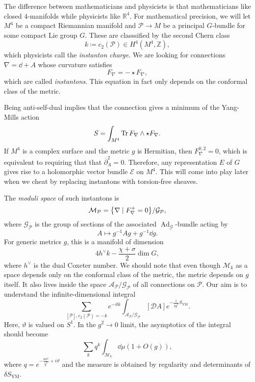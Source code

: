 \documentclass[leqno, openany]{memoir}
\theoremstyle{definition}
\theoremstyle{remark}
\theoremstyle{plain}
\theoremstyle{definition}
\theoremstyle{remark}
\newcommand{\R}{\mathbb{R}}
\newcommand{\Z}{\mathbb{Z}}
\newcommand{\mc}[1]{\mathcal{#1}}
\newcommand{\mr}[1]{\mathrm{#1}}
\newcommand{\ol}[1]{\overline{#1}}
\DeclareMathOperator{\Ad}{Ad}
\begin{document}
The difference between mathematicians and physicists is that mathematicians like closed $4$-manifolds while physicists like $\R^4$. For mathematical precision, we will let $M^4$ be a compact Riemannian manifold and $\mc{P} \to M$ be a principal $G$-bundle for some compact Lie group $G$. These are classsified by the second Chern class
\[ k \coloneqq c_2(\mc{P}) \in H^4(M^4, \Z), \]
which physicists call the \textit{instanton charge}. We are looking for connections $\nabla = \dd + A$ whose curvature satisfies
\[ F_{\nabla} = - \star F_{\nabla}, \]
which are called \textit{instantons}. This equation in fact only depends on the conformal class of the metric.

Being anti-self-dual implies that the connection gives a minimum of the Yang-Mills action
\[ S = \int_{M^4} \Tr F_{\nabla} \wedge \star F_{\nabla}. \]
If $M^4$ is a complex surface and the metric $g$ is Hermitian, then $F_{\nabla}^{0,2} = 0$, which is equivalent to requiring that that $\ol{\partial}_A^2 = 0$. Therefore, any representation $E$ of $G$ gives rise to a holomorphic vector bundle $\mc{E}$ on $M^4$. This will come into play later when we cheat by replacing instantons with torsion-free sheaves.

The \textit{moduli space} of such instantons is
\[ \mc{M}_{\mc{P}} = \qty{\nabla \mid F_{\nabla}^+ = 0} / \mc{G}_{\mc{P}}, \]
where $\mc{G}_{\mc{P}}$ is the group of sections of the associated $\Ad_{\mc{G}}$-bundle acting by
\[ A \mapsto g^{-1} A g + g^{-1} \dd g. \]
For generic metrics $g$, this is a manifold of dimension
\[ 4 h^{\vee} k - \frac{\chi + \sigma}{2} \dim G, \]
where $h^{\vee}$ is the dual Coxeter number. We should note that even though $\mc{M}_k$ as a space depends only on the conformal class of the metric, the metric depends on $g$ itself. It also lives inside the space $\mc{A}_{\mc{P}}/\mc{G}_{\mc{P}}$ of all connections on $\mc{P}$. Our aim is to understand the infinite-dimensional integral
\[ \sum_{[\mc{P}], c_2(\mc{P}) = -k} e^{- \vartheta k} \int_{\mc{A}_{\mc{P}}/\mc{G}_{\mc{P}}} [\mc{D}A] e^{-\frac{1}{4g^2} S_{\mr{YM}}}. \]
Here, $\vartheta$ is valued on $S^1$. In the $g^2 \to 0$ limit, the asymptotics of the integral should become
\[ \sum_k q^k \int_{\mc{M}_k} \dd{\mu} (1 + O(g)), \]
where $q = e^{-\frac{8\pi^2}{g^2} + i\vartheta}$ and the measure is obtained by regularity and determinants of $\delta S_{\mr{YM}}$.
\end{document}
